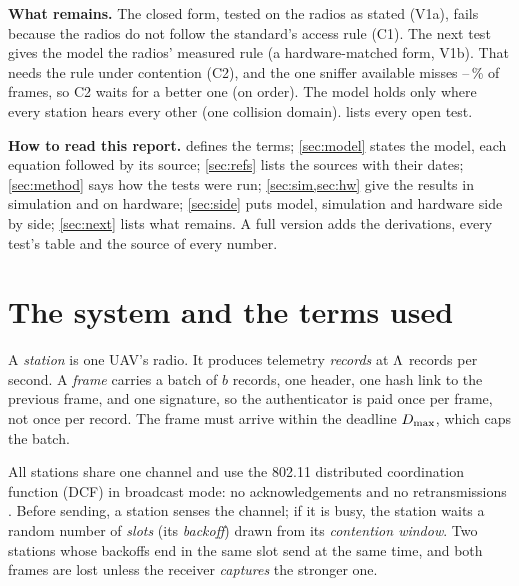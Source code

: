 \documentclass[11pt,a4paper]{article}
\newif\iffull
\begin{document}
\textbf{What remains.} The closed form, tested on the radios as stated (V1a), fails because the
radios do not follow the standard's access rule (C1). The next test gives the model the radios'
measured rule (a hardware-matched form, V1b). That needs the rule under contention (C2), and the one
sniffer available misses \snifMissMin--\snifMissMax\,\% of frames, so C2 waits for a better one (on
order). The model holds only where every station hears every other (one collision domain).
 lists every open test.

\iffull\else
\textbf{How to read this report.}  defines the terms; \cref{sec:model} states the
model, each equation followed by its source; \cref{sec:refs} lists the sources with their dates;
\cref{sec:method} says how the tests were run; \cref{sec:sim,sec:hw} give the results in simulation
and on hardware; \cref{sec:side} puts model, simulation and hardware side by side;
\cref{sec:next} lists what remains. A full version adds the derivations, every test's table and the
source of every number.
\fi

\section{The system and the terms used}\label{sec:system}

A \emph{station} is one UAV's radio. It produces telemetry \emph{records} at $\Lambda$ records per
second. A \emph{frame} carries a batch of $b$ records, one header, one hash link to the previous
frame, and one signature, so the authenticator is paid once per frame, not once per record. The
frame must arrive within the deadline $D_{\max}$, which caps the batch.

All stations share one channel and use the 802.11 distributed coordination function (DCF) in
broadcast mode: no acknowledgements and no retransmissions \cite{ieee80211std2020}. Before sending,
a station senses the channel; if it is busy, the station waits a random number of \emph{slots}
(its \emph{backoff}) drawn from its \emph{contention window}. Two stations whose backoffs end in the
same slot send at the same time, and both frames are lost unless the receiver \emph{captures} the
stronger one.
\end{document}

